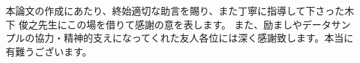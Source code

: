 \theacknowledgments
本論文の作成にあたり、終始適切な助言を賜り、また丁寧に指導して下さった木下 俊之先生にこの場を借りて感謝の意を表します。
また、励ましやデータサンプルの協力・精神的支えになってくれた友人各位には深く感謝致します。本当に有難うございます。
